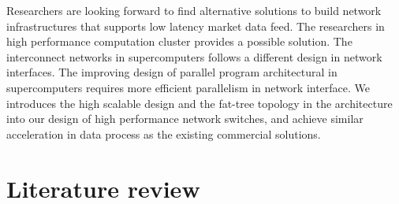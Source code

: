 \documentclass[11pt,openright,a4paper]{report}
\begin{document}
Researchers are looking forward to find alternative solutions to build network infrastructures that supports low latency market data feed. The researchers in high performance computation cluster provides a possible solution. The interconnect networks in supercomputers follows a different design in network interfaces. The improving design of parallel program architectural in supercomputers requires more efficient parallelism in network interface\cite{pang2014th}. We introduces the high scalable design and the fat-tree topology in the architecture into our design of high performance network switches, and achieve similar acceleration in data process as the existing commercial solutions.\\

\section{Literature review}
\end{document}
